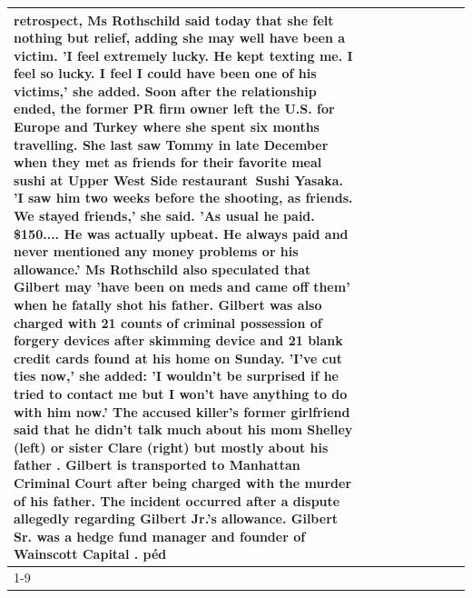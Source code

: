 \begin{table}[H]
\begin{tabular}{lllrlllll}
retrospect, Ms Rothschild said today that she felt nothing but relief, adding she may well have been a victim. 'I feel extremely lucky. He kept texting me. I feel so lucky. I feel I could have been one of his victims,' she added. Soon after the relationship ended, the former PR firm owner left the U.S. for Europe and Turkey where she spent six months  travelling. She last saw Tommy in late December when they met as friends for their favorite meal sushi at Upper West Side restaurant Sushi Yasaka. 'I saw him two weeks before the shooting, as friends. We stayed friends,' she said. 'As usual he paid. \$150.... He was actually upbeat. He always paid and never mentioned any money problems or his allowance.' Ms Rothschild also speculated that Gilbert may 'have been on meds and came off them' when he fatally shot his father. Gilbert was also charged with 21 counts of criminal possession of forgery devices after skimming device and 21 blank credit cards found at his home on Sunday. 'I've cut ties now,' she added: 'I wouldn’t be surprised if he tried to contact me but I won’t have anything to do with him now.' The accused killer's former girlfriend said that he didn't talk much about his mom Shelley (left) or sister Clare (right) but mostly about his father . Gilbert is transported to Manhattan Criminal Court  after being charged with the murder of his father. The incident occurred after a dispute allegedly regarding Gilbert Jr.'s allowance. Gilbert Sr. was a hedge fund manager and founder of Wainscott Capital . péd \\
\cline{1-9} \cline{2-9}

\end{tabular}
\end{table}
